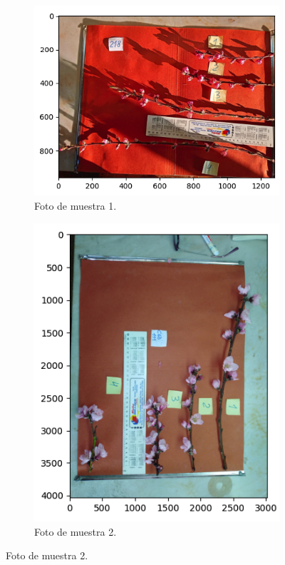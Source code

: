\begin{figure}[ht]
     \centering
     \begin{subfigure}[b]{0.4\textwidth}
         \centering
         \includegraphics[scale=.4]{./Figures/flor_muestra5.png}
         \caption{Foto de muestra 1.}
         \label{fig:1de3}
     \end{subfigure}
     \hfill
     \begin{subfigure}[b]{0.4\textwidth}
         \centering
         \includegraphics[scale=.4]{./Figures/flor_muestra3.png}
         \caption{Foto de muestra 2.}
         \label{fig:2de3}

\end{subfigure}
\end{figure}
